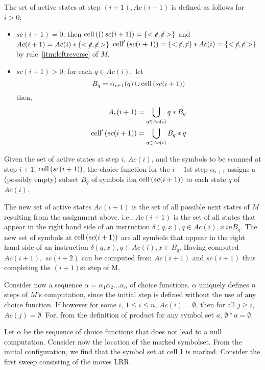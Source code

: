 The set of active states at step $(i+1), Ac(i+1)$ is defined as follows for $i>0$:
\begin{itemize}
    \item \label{itm:leftstate} $sc(i+1)=0$; then $\mathrm{cell}\left((\right)sc(i+1)) = \{<\cancel{c},\cancel{c}>\}$
    and $Ac(i+1) = Ac(i) * \{<\cancel{c}, \cancel{c}>\}$
    $\mathrm{cell}'\left(sc(i+1)\right) = \{<\cancel{c},\cancel{c}\} * Ac(i) = \{<\cancel{c}, \cancel{c}>\}$ by rule~\ref{itm:leftreverse} of $M$.
    \item \label{itm:notleftstate} $sc(i+1)>0$; for each $q \in Ac(i),$ let
    \[
        B_q = \alpha_{i+1}(q) \cup \mathrm{cell}\left(sc(i+1)\right)
    \]
    then,
    \begin{align*}
        A_c(i+1) &= \bigcup_{q \in Ac(i)} {q} * B_q \\
        \mathrm{cell}'\left(sc(i+1)\right) &= \bigcup_{q \in Ac(i)} B_q * {q}
    \end{align*}
\end{itemize}
Given the set of active states at step $i$, $Ac(i)$, and the symbols to be
scanned at step $i+1$, $\mathrm{cell}\left(sc(i+1)\right)$, the choice function for the $i+1$st
step $\alpha_{i+1}$ assigns a (possibly empty) subset $B_q$ of symbols ibn
$\mathrm{cell}\left(sc(i+1)\right)$ to each state $q$ of $Ac(i)$.

The new set of active states $Ac(i+1)$ is the set of all possible next states
of $M$ resulting from the assignment above.
i.e., $Ac(i+1)$ is the
set of all states that appear in the right hand side of an instruction
$\delta(q,x), q \in Ac(i), x \ in B_q$.
The new set of symbols at $\mathrm{cell}\left(sc(i+1)\right)$ are all symbols that
appear in the right hand side of an instruction
$\delta(q,x), q \in Ac(i), x \in B_q$.
Having computed $Ac(i+1),$ $sc(i+2)$ can be computed
from $Ac(i+1)$ and $sc(i+1)$ thus completing the $(i+1)$st step of M.

Consider now a sequence $\alpha = \alpha_1 \alpha_2 \ldots \alpha_n$
of choice functions.
$\alpha$ uniquely defines $n$ steps of $M$'s
computation, since the initial step is defined without the use of
any choice function.
If however for some $i$, $1 \leq i \leq n$,
$Ac(i) = \emptyset$, then for all $j \geq i$, $Ac(j) = \emptyset$.
For, from the definition of product for any symbol set $a$,
$\emptyset * a = \emptyset$.

Let $\alpha$ be the sequence of choice functions that does not lead to a
null computation.
Consider now the location of the marked symbolset.
From the initial configuration, we find that the symbol set at cell 1 is
marked.
Consider the first sweep consisting of the moves LRR.


